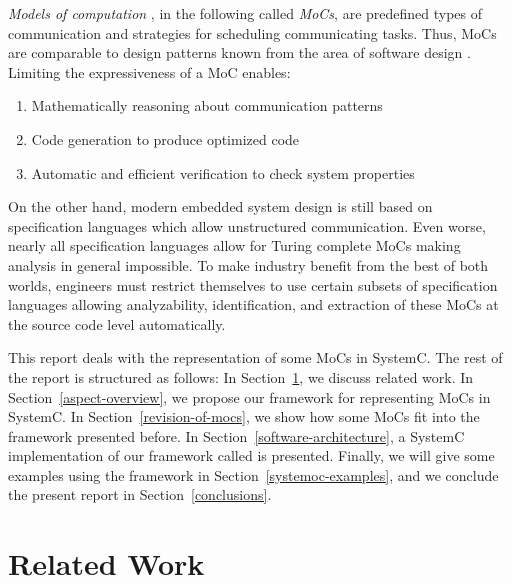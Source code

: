 \emph{Models of computation}
\cite{embsft:2002}, in the following called \emph{MoCs}, are
predefined types of communication and strategies for scheduling
communicating tasks. Thus, MoCs are comparable to design
patterns known from the area of software design \cite{gamma:1995}.
Limiting the expressiveness of a MoC enables:

\begin{enumerate}
\item Mathematically reasoning about communication patterns

\item Code generation to produce optimized code

\item Automatic and efficient verification to check system properties
\end{enumerate}

On the other hand, modern embedded system design is still based on
specification languages which allow unstructured communication.
Even worse, nearly all specification languages allow for Turing
complete MoCs making analysis in general impossible.
To make industry benefit from the best of both worlds,
engineers must restrict themselves to use certain subsets of
specification languages allowing analyzability, identification,
and extraction of these MoCs at the source code level automatically.

This report deals with the representation of some %
MoCs in SystemC. The rest of the report is structured as follows:
In Section~\ref{related-work}, we discuss related work. In
Section~\ref{aspect-overview}, we propose our framework for
representing MoCs in SystemC. In Section~\ref{revision-of-mocs},
we show how some MoCs fit into
the framework presented before. In Section~\ref{software-architecture},
a SystemC implementation of our framework called \SysteMoC{} is
presented. Finally, we will give some examples using the \SysteMoC{}
framework in Section~\ref{systemoc-examples}, and we conclude
the present report in Section~\ref{conclusions}.

\section{Related Work}\label{related-work}

